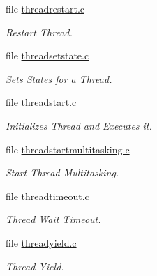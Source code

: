 \begin{DoxyCompactItemize}
file \mbox{\hyperlink{threadrestart_8c}{threadrestart.\+c}}
\begin{DoxyCompactList}\small\item\em Restart Thread. \end{DoxyCompactList}\item 
file \mbox{\hyperlink{threadsetstate_8c}{threadsetstate.\+c}}
\begin{DoxyCompactList}\small\item\em Sets States for a Thread. \end{DoxyCompactList}\item 
file \mbox{\hyperlink{threadstart_8c}{threadstart.\+c}}
\begin{DoxyCompactList}\small\item\em Initializes Thread and Executes it. \end{DoxyCompactList}\item 
file \mbox{\hyperlink{threadstartmultitasking_8c}{threadstartmultitasking.\+c}}
\begin{DoxyCompactList}\small\item\em Start Thread Multitasking. \end{DoxyCompactList}\item 
file \mbox{\hyperlink{threadtimeout_8c}{threadtimeout.\+c}}
\begin{DoxyCompactList}\small\item\em Thread Wait Timeout. \end{DoxyCompactList}\item 
file \mbox{\hyperlink{threadyield_8c}{threadyield.\+c}}
\begin{DoxyCompactList}\small\item\em Thread Yield. \end{DoxyCompactList}\end{DoxyCompactItemize}
